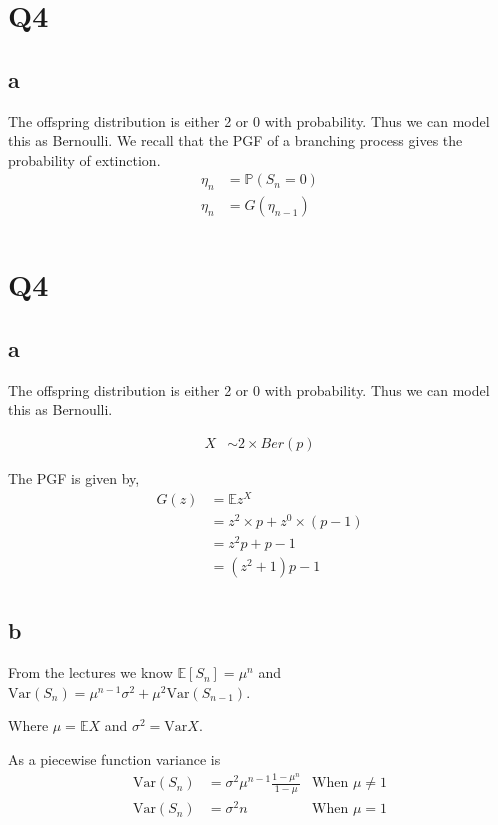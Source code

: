 \documentclass{article}
\newcommand{\prob}{\mathbb{P}}
\newcommand{\expect}{\mathbb{E}}
\newcommand{\var}{\text{Var}}
\begin{document}
\section{Q4}
\subsection{a}
The offspring distribution is either 2 or 0 with probability. Thus we can
model this as Bernoulli.%
We recall that the PGF of a branching process gives the probability of
extinction.
\begin{align*}
    \eta_n &= \prob(S_n = 0) \\
    \eta_n &= G(\eta_{n-1}) \\
\end{align*}

\section{Q4}
\subsection{a}
The offspring distribution is either 2 or 0 with probability. Thus we can
model this as Bernoulli.

\begin{align*}
    X &\sim 2 \times Ber(p)
\end{align*}

The PGF is given by,
\begin{align*}
    G(z) &= \expect z^X \\
    &= z^2 \times p + z^0 \times (p-1) \\
    &= z^2 p + p - 1 \\
    &= \left(z^2 + 1\right) p - 1 \\
\end{align*}

\subsection{b}
From the lectures we know $\expect[S_n] = \mu^n$ and
$\var(S_n) = \mu^{n-1} \sigma^2 + \mu^2 \var(S_{n-1})$.

Where $\mu = \expect X$ and $\sigma^2 = \var X$.

As a piecewise function variance is
\begin{align*}
    \var(S_n) &= \sigma^2 \mu^{n-1} \frac{1-\mu^n}{1-\mu}
    & \text{When $\mu \neq 1$} \\
    \var(S_n) &= \sigma^2 n
    & \text{When $\mu = 1$}
\end{align*}
\end{document}
